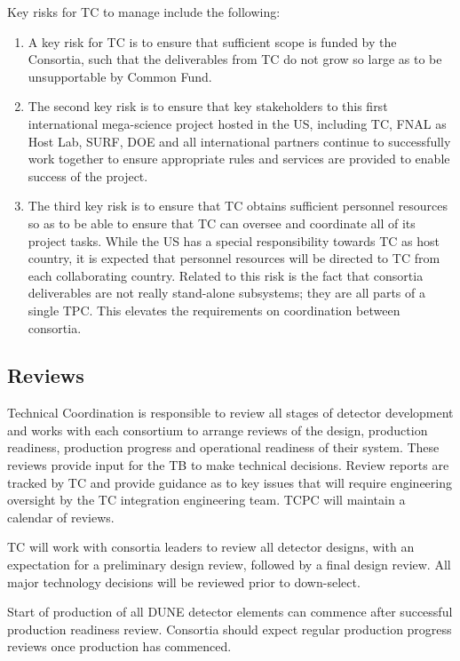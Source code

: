 Key risks for TC to manage include the following:
\begin{enumerate}
  \item A key risk for TC is to ensure that sufficient scope is funded
    by the Consortia, such that the deliverables from TC do not grow
    so large as to be unsupportable by Common Fund.
  \item The second key risk is to ensure that key stakeholders to this
    first international mega-science project hosted in the US,
    including TC, FNAL as Host Lab, SURF, DOE and all international
    partners continue to successfully work together to ensure
    appropriate rules and services are provided to enable success of
    the project.
  \item The third key risk is to ensure that TC obtains sufficient
    personnel resources so as to be able to ensure that TC can oversee
    and coordinate all of its project tasks.  While the US has a
    special responsibility towards TC as host country, it is expected
    that personnel resources will be directed to TC from each
    collaborating country. Related to this risk is the fact that
    consortia deliverables are not really stand-alone subsystems; they
    are all parts of a single TPC. This elevates the requirements on
    coordination between consortia.
\end{enumerate}



\subsection{Reviews}
\label{sec:fdsp-coord-reviews}

Technical Coordination is responsible to review all stages of detector
development and works with each consortium to arrange reviews of the
design, production readiness, production progress and operational
readiness of their system.  These reviews provide input for the TB to
make technical decisions.  Review reports are tracked by TC and
provide guidance as to key issues that will require engineering
oversight by the TC integration engineering team. TCPC will maintain a
calendar of  reviews.

TC will work with consortia leaders to review all detector designs,
with an expectation for a preliminary design review, followed by a
final design review. All major technology decisions will be reviewed
prior to down-select.

Start of production of all DUNE detector elements can commence after
successful production readiness review. Consortia should expect
regular production progress reviews once production has commenced.

